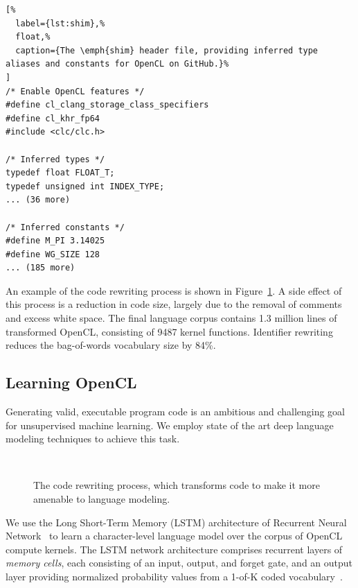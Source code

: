 \lstset{language=C}
\begin{lstlisting}[%
  label={lst:shim},%
  float,%
  caption={The \emph{shim} header file, providing inferred type aliases and constants for OpenCL on GitHub.}%
]
/* Enable OpenCL features */
#define cl_clang_storage_class_specifiers
#define cl_khr_fp64
#include <clc/clc.h>

/* Inferred types */
typedef float FLOAT_T;
typedef unsigned int INDEX_TYPE;
... (36 more)

/* Inferred constants */
#define M_PI 3.14025
#define WG_SIZE 128
... (185 more)
\end{lstlisting}

\noindent %
An example of the code rewriting process is shown in Figure~\ref{lst:norm}. A side effect of this process is a reduction in code size, largely due to the removal of comments and excess white space. The final language corpus contains 1.3 million lines of transformed OpenCL, consisting of 9487 kernel functions. Identifier rewriting reduces the bag-of-words vocabulary size by 84\%.

\subsection{Learning OpenCL}\label{sec:ml}

Generating valid, executable program code is an ambitious and challenging goal for unsupervised machine learning. We employ state of the art deep language modeling techniques to achieve this task.

\begin{figure}
  \centering%
  \\%
  \caption{The code rewriting process, which transforms code to make it more amenable to language modeling.}%
  \label{lst:norm}%
\end{figure}

We use the Long Short-Term Memory (LSTM) architecture of Recurrent Neural Network~\cite{Sundermeyer2012,Mikolov2015} to learn a character-level language model over the corpus of OpenCL compute kernels. The LSTM network architecture comprises recurrent layers of \emph{memory cells}, each consisting of an input, output, and forget gate, and an output layer providing normalized probability values from a 1-of-K coded vocabulary~\cite{Graves}.

